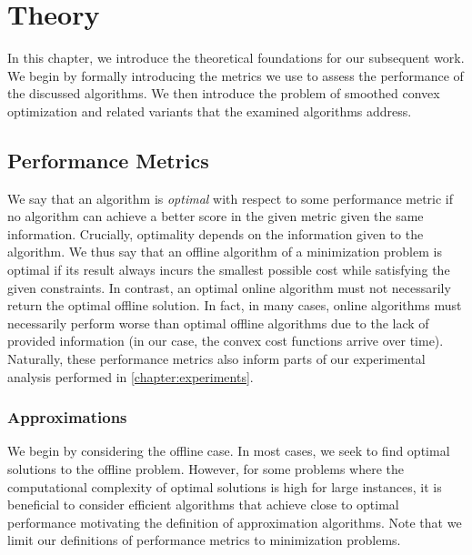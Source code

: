
\chapter{Theory}\label{chapter:theory}

In this chapter, we introduce the theoretical foundations for our subsequent work. We begin by formally introducing the metrics we use to assess the performance of the discussed algorithms. We then introduce the problem of smoothed convex optimization and related variants that the examined algorithms address.

\section{Performance Metrics}\label{section:theory:performance_metrics}

We say that an algorithm is \emph{optimal} with respect to some performance metric if no algorithm can achieve a better score in the given metric given the same information. Crucially, optimality depends on the information given to the algorithm. We thus say that an offline algorithm of a minimization problem is optimal if its result always incurs the smallest possible cost while satisfying the given constraints. In contrast, an optimal online algorithm must not necessarily return the optimal offline solution. In fact, in many cases, online algorithms must necessarily perform worse than optimal offline algorithms due to the lack of provided information (in our case, the convex cost functions arrive over time). Naturally, these performance metrics also inform parts of our experimental analysis performed in \autoref{chapter:experiments}.

\subsection{Approximations}

We begin by considering the offline case. In most cases, we seek to find optimal solutions to the offline problem. However, for some problems where the computational complexity of optimal solutions is high for large instances, it is beneficial to consider efficient algorithms that achieve close to optimal performance motivating the definition of approximation algorithms. Note that we limit our definitions of performance metrics to minimization problems.

